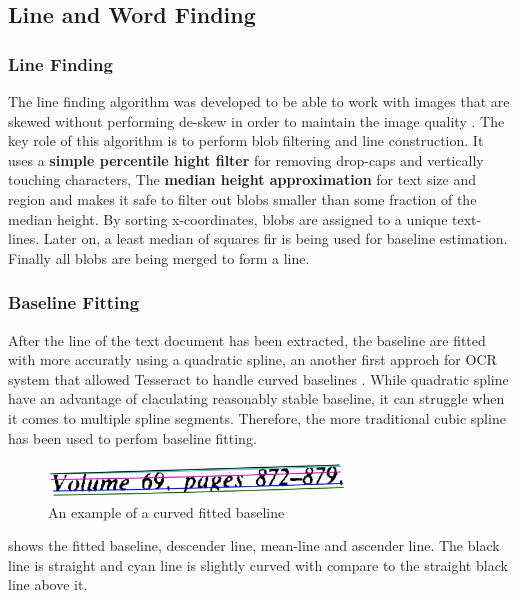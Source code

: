 \subsection{Line and Word Finding}
\subsubsection{Line Finding}

The line finding algorithm was developed to be able to work with images that are skewed without performing de-skew in order to maintain  the image quality \cite{Line_Finding_Algorithem}. The key role of this algorithm is to perform blob filtering and line construction. It uses a \textbf{simple percentile hight filter} for removing drop-caps and vertically touching characters, The \textbf{median height approximation} for text size and region and makes it safe to filter out blobs smaller than some fraction of the median height. By sorting x-coordinates, blobs are assigned to a unique text-lines. Later on, a least median of squares fir \cite{least_median_squares_algorithm} is being used for baseline estimation. Finally all blobs are being merged to form a line.

\subsubsection{Baseline Fitting}

After the line of the text document has been extracted, the baseline are fitted with more accuratly using a quadratic spline, an another first approch for OCR system that allowed Tesseract to handle curved baselines \cite{quadratic_spline_algorithm}. While quadratic spline have an advantage of claculating reasonably stable baseline, it can struggle when it comes to multiple spline segments. Therefore, the more traditional cubic spline \cite{Traditional_cubic_algorithm} has been used to perfom baseline fitting.

\begin{figure}[h]
    \centering
    \includegraphics[width=0.7\textwidth]{chapters/images/OCR/Base_Line_Fitting.JPG}
    \caption{An example of a curved fitted baseline \cite{AnOverviewoftheTesseractOCREngine}}
    \label{fig:Baseline_Fitting}
\end{figure}

 shows the fitted baseline, descender line, mean-line and ascender line. The black line is straight and cyan line is slightly curved with compare to the straight black line above it.

